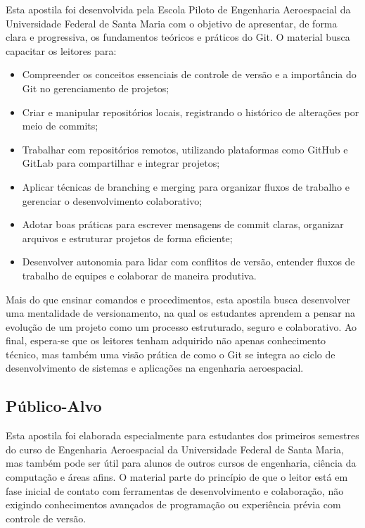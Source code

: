 Esta apostila foi desenvolvida pela Escola Piloto de Engenharia Aeroespacial da Universidade Federal de Santa Maria com o objetivo de apresentar, de forma clara e progressiva, os fundamentos teóricos e práticos do Git. O material busca capacitar os leitores para:

\begin{itemize}
    \item Compreender os conceitos essenciais de controle de versão e a importância do Git no gerenciamento de projetos;
    \item Criar e manipular repositórios locais, registrando o histórico de alterações por meio de commits;
    \item Trabalhar com repositórios remotos, utilizando plataformas como GitHub e GitLab para compartilhar e integrar projetos;
    \item Aplicar técnicas de branching e merging para organizar fluxos de trabalho e gerenciar o desenvolvimento colaborativo;
    \item Adotar boas práticas para escrever mensagens de commit claras, organizar arquivos e estruturar projetos de forma eficiente;
    \item Desenvolver autonomia para lidar com conflitos de versão, entender fluxos de trabalho de equipes e colaborar de maneira produtiva.
\end{itemize}

Mais do que ensinar comandos e procedimentos, esta apostila busca desenvolver uma mentalidade de versionamento, na qual os estudantes aprendem a pensar na evolução de um projeto como um processo estruturado, seguro e colaborativo. Ao final, espera-se que os leitores tenham adquirido não apenas conhecimento técnico, mas também uma visão prática de como o Git se integra ao ciclo de desenvolvimento de sistemas e aplicações na engenharia aeroespacial.

\subsection{Público-Alvo}

Esta apostila foi elaborada especialmente para estudantes dos primeiros semestres do curso de Engenharia Aeroespacial da Universidade Federal de Santa Maria, mas também pode ser útil para alunos de outros cursos de engenharia, ciência da computação e áreas afins. O material parte do princípio de que o leitor está em fase inicial de contato com ferramentas de desenvolvimento e colaboração, não exigindo conhecimentos avançados de programação ou experiência prévia com controle de versão.

